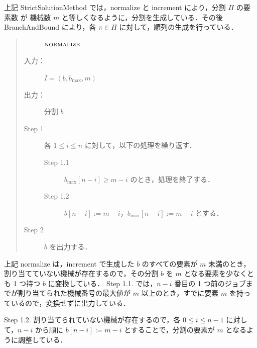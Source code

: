 \documentclass[12pt]{optlab-bachelor}
\begin{document}
上記 {\sc StrictSolutionMethod} では，{\sc normalize} と {\sc increment} により，分割 $\Pi$ の要素数 が 機械数 $m$ と等しくなるように，分割を生成している．その後 {\sc BranchAndBound} により，各 $\pi \in \Pi$ に対して，順列の生成を行っている．

\begin{quote}
  \begin{description}
    \item[]  ${\mbox {\bf {\sc normalize}}}$
    \item[入力：] $I = (b, b_{\max}, m)$
    \item[出力：] 分割 $b$
  \end{description}
  \begin{description}
    \item[Step 1] 各 $1 \le i \le n$ に対して，以下の処理を繰り返す．
    \begin{description}
      \item[Step 1.1] $b_{\max}[n - i] \ge m - i$ のとき，処理を終了する．
      \item[Step 1.2] $b[n - i] := m - i$，$b_{\max}[n - i] := m - i$ とする．
    \end{description}
    \item[Step 2] $b$ を出力する．
  \end{description}
\end{quote}

上記 {\sc normalize} は，{\sc increment} で生成した $b$ のすべての要素が $m$ 未満のとき，割り当てていない機械が存在するので，その分割 $b$ を $m$ となる要素を少なくとも 1 つ持つ $b$ に変換している．
Step 1.1. では，$n - i$ 番目の 1 つ前のジョブまでが割り当てられた機械番号の最大値が $m$ 以上のとき，すでに要素 $m$ を持っているので，変換せずに出力している．

Step 1.2. 割り当てられていない機械が存在するので，各 $0 \le i \le n - 1$ に対して，$n - i$ から順に $b[n-i] := m - i$ とすることで，分割の要素が $m$ となるように調整している．
\end{document}
